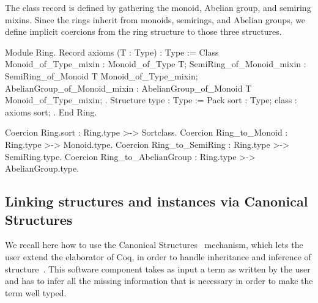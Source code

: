 \documentclass[a4paper,UKenglish,cleveref, autoref]{lipics-v2019}
\newcommand{\mixins}{mixins}
\theoremstyle{implem}
\theoremstyle{implem}
\theoremstyle{command}
\begin{document}
The class record is defined by gathering the monoid, Abelian group, and
semiring \mixins{}. Since the rings inherit from monoids, semirings, and
Abelian groups, we define implicit coercions from the ring structure to those
three structures.
\begin{coqcode}
Module Ring.
Record axioms (T : Type) : Type := Class {
  Monoid_of_Type_mixin : Monoid_of_Type T;
  SemiRing_of_Monoid_mixin : SemiRing_of_Monoid T Monoid_of_Type_mixin;
  AbelianGroup_of_Monoid_mixin : AbelianGroup_of_Monoid T Monoid_of_Type_mixin; }.
Structure type : Type := Pack { sort : Type; class : axioms sort; }.
End Ring.

Coercion Ring.sort : Ring.type >-> Sortclass.
Coercion Ring_to_Monoid : Ring.type >-> Monoid.type.
Coercion Ring_to_SemiRing : Ring.type >-> SemiRing.type.
Coercion Ring_to_AbelianGroup : Ring.type >-> AbelianGroup.type.
\end{coqcode}

\subsection{Linking structures and instances via Canonical Structures}

We recall here how to use the Canonical
Structures~\cite{DBLP:conf/itp/MahboubiT13,Saibi99phd} mechanism, which
lets the user extend the elaborator of Coq, in order to handle
inheritance and inference of structure~\cite{affeldt:hal-02463336,KSdraft,DBLP:conf/tphol/GarillotGMR09}.
This software component
takes as input a term as written by the user and has to infer all the missing information that is necessary in order to make the term well typed.
\end{document}
